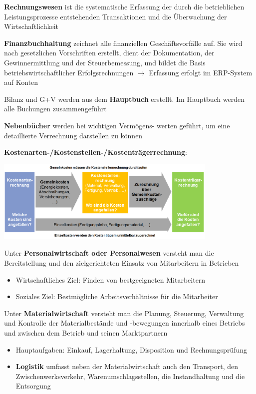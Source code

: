 \textbf{Rechnungswesen} ist die systematische Erfassung der durch die betrieblichen Leistungsprozesse entstehenden Transaktionen und die Überwachung der Wirtschaftlichkeit

\textbf{Finanzbuchhaltung} zeichnet alle finanziellen Geschäftsvorfälle auf. Sie wird nach gesetzlichen Vorschriften erstellt, dient der Dokumentation, der Gewinnermittlung und der Steuerbemessung, und bildet die Basis betriebswirtschaftlicher Erfolgsrechnungen $\rightarrow$ Erfassung erfolgt im ERP-System auf Konten

Bilanz und G+V werden aus dem \textbf{Hauptbuch} erstellt. Im Hauptbuch werden alle Buchungen zusammengeführt

\textbf{Nebenbücher} werden bei wichtigen Vermögens- werten geführt, um eine detaillierte Verrechnung darstellen zu können

\textbf{Kostenarten-/Kostenstellen-/Kostenträgerrechnung}: 
\begin{center}
	\includegraphics[width=0.8\textwidth]{images/kkk.png}
\end{center}

Unter \textbf{Personalwirtschaft oder Personalwesen} versteht man die Bereitstellung und den zielgerichteten Einsatz von Mitarbeitern in Betrieben
\begin{itemize}
	\item Wirtschaftliches Ziel: Finden von bestgeeigneten Mitarbeitern
	\item Soziales Ziel: Bestmögliche Arbeitsverhältnisse für die Mitarbeiter
\end{itemize}

Unter \textbf{Materialwirtschaft} versteht man die Planung, Steuerung, Verwaltung und Kontrolle der Materialbestände und -bewegungen innerhalb eines Betriebs und zwischen dem Betrieb und seinen Marktpartnern
\begin{itemize}
	\item Hauptaufgaben: Einkauf, Lagerhaltung, Disposition und Rechnungsprüfung
	\item \textbf{Logistik} umfasst neben der Materialwirtschaft auch den Transport, den Zwischenwerksverkehr, Warenumschlagsstellen, die Instandhaltung und die Entsorgung
\end{itemize}

